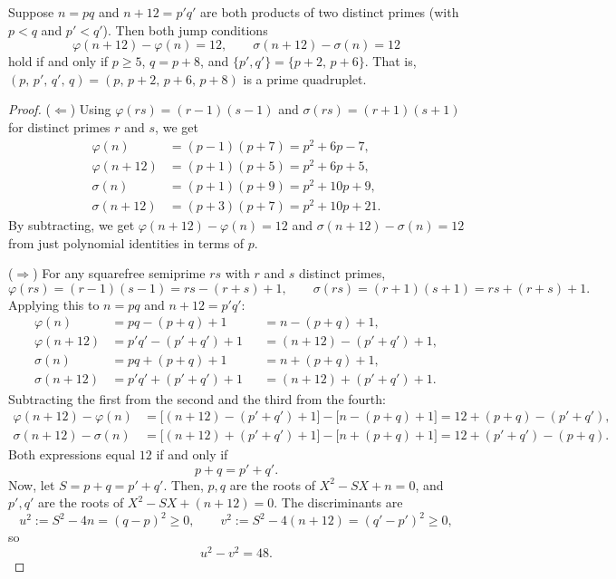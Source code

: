 \documentclass[10pt,a4paper]{amsart}
\begin{document}
\begin{theorem}\label{thm:semiprime-char}
Suppose $n = pq$ and $n+12 = p'q'$ are both products of two distinct primes (with $p < q$ and $p' < q'$). Then both jump conditions
\[
\varphi(n+12) - \varphi(n) = 12, \qquad \sigma(n+12) - \sigma(n) = 12
\]
hold if and only if $p \ge 5$, $q = p+8$, and $\{p', q'\} = \{p+2,\, p+6\}$. That is, $(p,\, p',\, q',\, q) = (p,\, p+2,\, p+6,\, p+8)$ is a prime quadruplet.\end{theorem}

\begin{proof}
($\Leftarrow$) Using $\varphi(rs) = (r-1)(s-1)$ and $\sigma(rs) = (r+1)(s+1)$ for distinct primes $r$ and $s$, we get
\begin{align*}
\varphi(n) &= (p-1)(p+7) = p^2 + 6p - 7, \\
\varphi(n+12) &= (p+1)(p+5) = p^2 + 6p + 5, \\
\sigma(n) &= (p+1)(p+9) = p^2 + 10p + 9, \\
\sigma(n+12) &= (p+3)(p+7) = p^2 + 10p + 21.
\end{align*}
By subtracting, we get $\varphi(n+12) - \varphi(n) = 12$ and $\sigma(n+12) - \sigma(n) = 12$ from just polynomial identities in terms of $p$.

($\Rightarrow$) For any squarefree semiprime $rs$ with $r$ and $s$ distinct primes,
\[
\varphi(rs) = (r-1)(s-1)=rs - (r+s) + 1, \qquad \sigma(rs) = (r+1)(s+1) = rs + (r+s) + 1.
\]
Applying this to $n = pq$ and $n+12 = p'q'$:
\begin{align*}
\varphi(n)      &= pq - (p+q) + 1                       &&= n - (p+q) + 1, \\
\varphi(n+12)   &= p'q' - (p'+q') + 1                   &&= (n+12) - (p'+q') + 1, \\
\sigma(n)       &= pq + (p+q) + 1                       &&= n + (p+q) + 1, \\
\sigma(n+12)    &= p'q' + (p'+q') + 1                   &&= (n+12) + (p'+q') + 1.
\end{align*}
Subtracting the first from the second and the third from the fourth:
\begin{align*}
\varphi(n+12) - \varphi(n) &= \bigl[(n+12) - (p'+q') + 1\bigr] - \bigl[n - (p+q) + 1\bigr] = 12 + (p+q) - (p'+q'), \\
\sigma(n+12)  - \sigma(n)  &= \bigl[(n+12) + (p'+q') + 1\bigr] - \bigl[n + (p+q) + 1\bigr] = 12 + (p'+q') - (p+q).
\end{align*}
Both expressions equal $12$ if and only if
\begin{equation}\label{eq:sum-eq}
p + q = p' + q'.
\end{equation}
Now, let $S = p+q = p'+q'$. Then, $p, q$ are the roots of $X^2 - SX + n = 0$, and $p', q'$ are the roots of $X^2 - SX + (n+12) = 0$. The discriminants are
\[
u^2 := S^2 - 4n = (q - p)^2 \ge 0, \qquad v^2 := S^2 - 4(n+12) = (q' - p')^2 \ge 0,
\]
so
\begin{equation}\label{eq:disc-diff}
u^2 - v^2 = 48.
\end{equation}


\end{proof}
\end{document}

